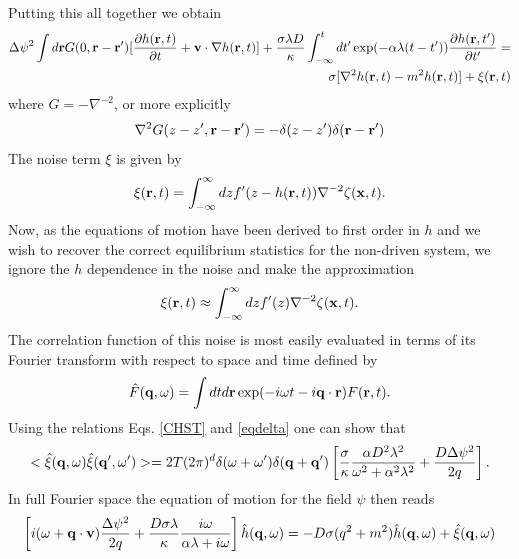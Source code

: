 Putting this all together we obtain
\begin{align}
    \Delta\psi^2 \int d{\bf r} G(0,{\bf r}-{\bf r}') [\frac{\partial h({\bf r},t)}{\partial t} +{\bf v}\cdot\nabla h({\bf r},t)] +\frac{\sigma\lambda D}{\kappa}\int_{-\infty}^t dt'
\exp(-\alpha\lambda(t-t'))\frac{\partial h({\bf r},t')}{\partial t'}
= \nonumber \\
 \sigma[\nabla^2 h({\bf r},t)-m^2 h({\bf r},t)] + \xi({\bf r},t)
    \label{em}
\end{align}
where $G= -\nabla^{-2}$, or more explicitly
\begin{equation}
    \nabla^2 G(z-z',{\bf r}-{\bf r}') = -\delta(z-z') \delta({\bf r}-{\bf r'})
\end{equation}
The noise term $\xi$ is given by
\begin{equation}
    \xi({\bf r},t) = \int_{-\infty}^{\infty} dz f'(z-h({\bf r},t)) \nabla^{-2} \zeta({\bf x},t).
\end{equation}
Now, as the equations of motion have been derived to first order in $h$ and we wish to recover the correct equilibrium statistics for the non-driven system, we ignore the $h$ dependence in the noise and make the approximation
\begin{equation}
    \xi({\bf r},t) \approx \int_{-\infty}^{\infty} dz f'(z) \nabla^{-2} \zeta({\bf x},t).
\end{equation}
The correlation function of this noise is most easily evaluated in terms of its Fourier transform with respect to  space and time  defined by
\begin{equation}
    \hat F({\bf q},\omega)=\int dt d{\bf r}\exp(-i\omega t -i{\bf q}\cdot{\bf r}) F({\bf r},t).
\end{equation}
Using the relations Eqs. \eqref{CHST} and \eqref{eqdelta} one  can show that
\begin{equation}
    < \hat \xi({\bf q},\omega)\hat \xi({\bf q}',\omega')> =2T(2\pi)^d \delta(\omega +\omega') \delta({\bf q}+{\bf q}') \left[ \frac{\sigma}{\kappa}\frac{\alpha D^2\lambda^2}{\omega^2 +\alpha^2\lambda^2} + \frac{D\Delta\psi^2}{2q}\right].
\end{equation}
In full Fourier space the equation of motion for the field $\psi$ then reads
\begin{equation}
    \left[i(\omega+{\bf q}\cdot{\bf v})\frac{\Delta\psi^2}{2q} + \frac{D\sigma\lambda}{\kappa} \frac{i\omega}{\alpha\lambda+i\omega}\right] \hat h({\bf q},\omega)= -D\sigma(q^2+m^2)\hat h({\bf q},\omega)+ \hat\xi({\bf q},\omega)
    \label{dyn}
\end{equation}

